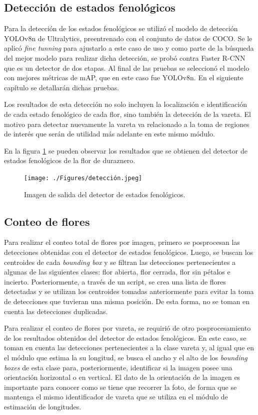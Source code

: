 \subsection{Detección de estados fenológicos}

Para la detección de los estados fenológicos se utilizó el modelo de detección YOLOv8n de Ultralytics, preentrenado con el conjunto de datos de COCO. Se le aplicó \textit{fine tunning} para ajustarlo a este caso de uso y como parte de la búsqueda del mejor modelo para realizar dicha detección, se probó contra Faster R-CNN que es un detector de dos etapas. Al final de las pruebas se seleccionó el modelo con mejores métricas de mAP, que en este caso fue YOLOv8n. En el siguiente capítulo se detallarán dichas pruebas.

Los resultados de esta detección no solo incluyen la localización e identificación de cada estado fenológico de cada flor, sino también la detección de la vareta. El motivo para detectar nuevamente la vareta va relacionado a la toma de regiones de interés que serán de utilidad más adelante en este mismo módulo.  

En la figura \ref{fig:deteccionEjem} se pueden observar los resultados que se obtienen del detector de estados fenológicos de la flor de duraznero.

\begin{figure}[ht]
	\centering
	\texttt{[image: ./Figures/detección.jpeg]}
	\caption{Imagen de salida del detector de estados fenológicos.}
	\label{fig:deteccionEjem}
\end{figure}


\subsection{Conteo de flores}

Para realizar el conteo total de flores por imagen, primero se posprocesan las detecciones obtenidas con el detector de estados fenológicos. Luego, se buscan los centroides de cada \textit{bounding box} y se filtran las detecciones pertenecientes a algunas de las siguientes clases: flor abierta, flor cerrada, flor sin pétalos e incierto. Posteriormente, a través de un script, se crea una lista de flores detectadas y se utilizan los centroides tomadas anteriormente para evitar la toma de detecciones que tuvieran una misma posición. De esta  forma, no se toman en cuenta las detecciones duplicadas.

Para realizar el conteo de flores por vareta, se requirió de otro posprocesamiento de los resultados obtenidos del detector de estados fenológicos. En este caso, se toman en cuenta las detecciones pertenecientes a la clase vareta y, al igual que en el módulo que estima la su longitud, se busca el ancho y el alto de los \textit{bounding boxes} de esta clase para, posteriormente, identificar si la imagen posee una orientación horizontal o en vertical. El dato de la orientación de la imagen es importante para conocer como se tiene que recorrer la foto, de forma que se mantenga el mismo identificador de vareta que se utiliza en el módulo de estimación de longitudes.

